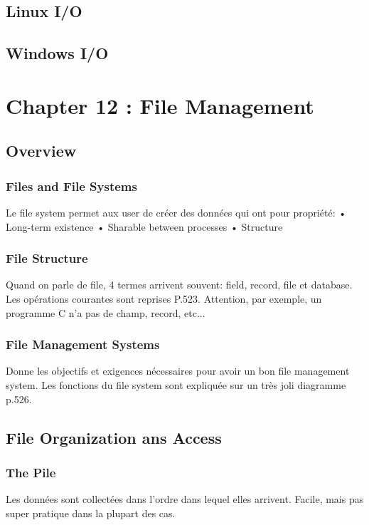 \subsection{Linux I/O}
\subsection{Windows I/O}

\newpage


\section{Chapter 12 : File Management}

\subsection{Overview}
\subsubsection{Files and File Systems}
Le file system permet aux user de créer des données qui ont pour propriété: • Long-term existence
• Sharable between processes
• Structure
\subsubsection{File Structure}
Quand on parle de file, 4 termes arrivent souvent: field, record, file et database. Les opérations courantes sont reprises P.523. Attention, par exemple, un programme C n’a pas de champ, record, etc...

\subsubsection{File Management Systems}
Donne les objectifs et exigences nécessaires pour avoir un bon file management system. Les fonctions du file system sont expliquée sur un très joli diagramme p.526.

\subsection{File Organization ans Access }
\subsubsection{The Pile}
Les données sont collectées dans l’ordre dans lequel elles arrivent. Facile, mais pas super pratique dans la plupart des cas.

